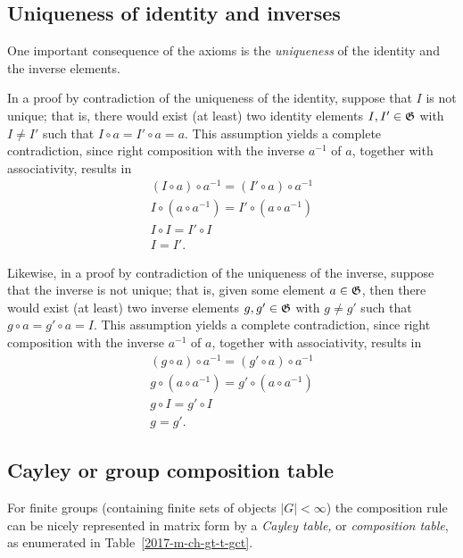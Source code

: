 \subsection{Uniqueness of identity and inverses}
One important consequence of the axioms is the {\em uniqueness} of the identity and the inverse elements.
{\color{OliveGreen}
\bproof
In a proof by contradiction of the uniqueness of the identity, suppose that $I$ is not unique; that is,
there would exist (at least) two identity elements $I,I' \in {\frak G}$  with $I\neq I'$
such that $I\circ a= I' \circ a =a$.
This assumption yields a complete contradiction, since right composition with the inverse $a^{-1}$ of $a$, together with associativity, results in
\begin{equation}
\begin{split}
(I\circ a) \circ   a^{-1}= (I' \circ a) \circ a^{-1}\\
I\circ (a \circ   a^{-1})= I' \circ (a \circ a^{-1})\\
I\circ I= I' \circ I \\
I= I'
.
\end{split}
\label{2017-m-ch-gt-pouide}
\end{equation}

Likewise, in a proof by contradiction of the uniqueness of the inverse, suppose that the inverse is not unique; that is,
given some element $a\in {\frak G}$, then there would exist (at least) two inverse elements $g,g' \in {\frak G}$ with $g\neq g'$
such that $g\circ a= g' \circ a =I$.
This assumption yields a complete contradiction, since right composition with the inverse $a^{-1}$ of $a$, together with associativity, results in
\begin{equation}
\begin{split}
(g\circ a) \circ   a^{-1}= (g' \circ a)  \circ   a^{-1}\\
g\circ (a \circ   a^{-1})= g' \circ (a  \circ   a^{-1})\\
g\circ I= g' \circ I\\
g = g'
.
\end{split}
\label{2017-m-ch-gt-pouie}
\end{equation}
\eproof
}

\subsection{Cayley or group composition table}
For finite groups (containing finite sets of objects $\vert G\vert <\infty$) the composition rule can be nicely represented in matrix form by a
{\em Cayley table,}
or {\em composition table},
as enumerated in Table~\ref{2017-m-ch-gt-t-gct}.

